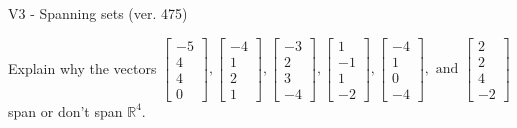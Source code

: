 \begin{exercise}
  \begin{exerciseTitle}V3 - Spanning sets (ver. 475)\end{exerciseTitle}
  \begin{exerciseStatement}
    Explain why the vectors \(\left[\begin{array}{r}
-5 \\
4 \\
4 \\
0
\end{array}\right] , \left[\begin{array}{r}
-4 \\
1 \\
2 \\
1
\end{array}\right] , \left[\begin{array}{r}
-3 \\
2 \\
3 \\
-4
\end{array}\right] , \left[\begin{array}{r}
1 \\
-1 \\
1 \\
-2
\end{array}\right] , \left[\begin{array}{r}
-4 \\
1 \\
0 \\
-4
\end{array}\right] , \text{ and } \left[\begin{array}{r}
2 \\
2 \\
4 \\
-2
\end{array}\right]\) span or don't span \(\mathbb{R}^4\). 
	



\end{exerciseStatement}
\end{exercise}

